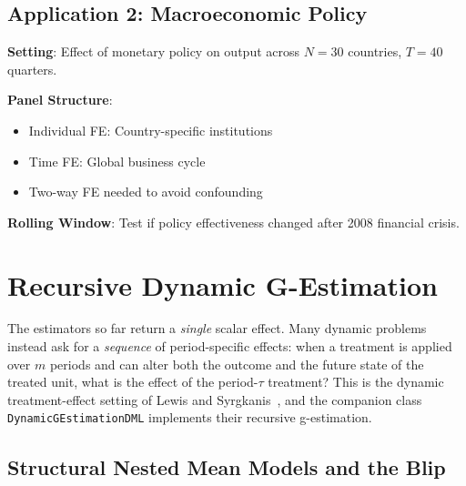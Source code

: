 \subsection{Application 2: Macroeconomic Policy}

\textbf{Setting}: Effect of monetary policy on output across $N = 30$ countries, $T = 40$ quarters.

\textbf{Panel Structure}:
\begin{itemize}
    \item Individual FE: Country-specific institutions
    \item Time FE: Global business cycle
    \item Two-way FE needed to avoid confounding
\end{itemize}

\textbf{Rolling Window}: Test if policy effectiveness changed after 2008 financial crisis.

\section{Recursive Dynamic G-Estimation}\label{sec:ch06_dynamic_g}

The estimators so far return a \emph{single} scalar effect. Many dynamic problems instead ask for a \emph{sequence} of period-specific effects: when a treatment is applied over $m$ periods and can alter both the outcome and the future state of the treated unit, what is the effect of the period-$\tau$ treatment? This is the dynamic treatment-effect setting of Lewis and Syrgkanis~\cite{lewisSyrgkanis2021}, and the companion class \texttt{DynamicGEstimationDML} implements their recursive g-estimation.


\subsection{Structural Nested Mean Models and the Blip}


